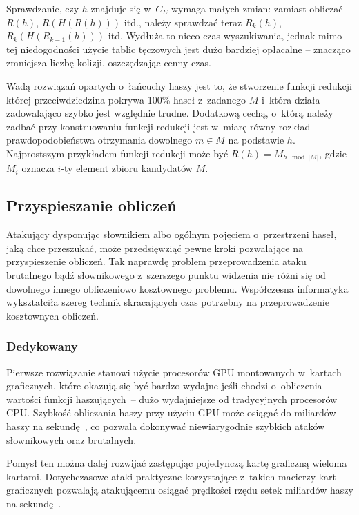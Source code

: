 Sprawdzanie, czy $h$ znajduje się w~$C_E$ wymaga małych zmian: zamiast obliczać
$R(h)$, $R(H(R(h)))$ itd., należy sprawdzać teraz $R_k(h)$, $R_k(H(R_{k-1}(h)))$
itd. Wydłuża to nieco czas wyszukiwania, jednak mimo tej niedogodności użycie
tablic tęczowych jest dużo bardziej opłacalne -- znacząco zmniejsza liczbę
kolizji, oszczędzając cenny czas.

Wadą rozwiązań opartych o~łańcuchy haszy jest to, że stworzenie funkcji
redukcji której przeciwdziedzina pokrywa 100\% haseł z~zadanego $M$ i~która
działa zadowalająco szybko jest względnie trudne. Dodatkową cechą, o~którą
należy zadbać przy konstruowaniu funkcji redukcji jest w~miarę równy rozkład
prawdopodobieństwa otrzymania dowolnego $m \in M$ na podstawie $h$.
Najprostszym przykładem funkcji redukcji może być $R(h) = M_{h \mod |M|}$,
gdzie $M_i$ oznacza $i$-ty element zbioru kandydatów $M$.



\subsection{Przyspieszanie obliczeń}
Atakujący dysponując słownikiem albo ogólnym pojęciem o~przestrzeni haseł, jaką
chce przeszukać, może przedsięwziąć pewne kroki pozwalające na przyspieszenie
obliczeń. Tak naprawdę problem przeprowadzenia ataku brutalnego bądź
słownikowego z~szerszego punktu widzenia nie różni się od dowolnego innego
obliczeniowo kosztownego problemu. Współczesna informatyka wykształciła szereg
technik skracających czas potrzebny na przeprowadzenie kosztownych obliczeń.



\subsubsection{Dedykowany }

Pierwsze rozwiązanie stanowi użycie procesorów GPU montowanych w~kartach
graficznych, które okazują się być bardzo wydajne jeśli chodzi o~obliczenia
wartości funkcji haszujących~-- dużo wydajniejsze od tradycyjnych procesorów
CPU. Szybkość obliczania haszy przy użyciu GPU może osiągać do miliardów
haszy na sekundę~\cite{gpu_cracking_benchmarks}, co pozwala dokonywać
niewiarygodnie szybkich ataków słownikowych oraz brutalnych.

Pomysł ten można dalej rozwijać zastępując pojedynczą kartę graficzną wieloma
kartami. Dotychczasowe ataki praktyczne korzystające z~takich macierzy kart
graficznych pozwalają atakującemu osiągać prędkości rzędu setek miliardów haszy
na sekundę~\cite{gpu_cracking_parallel}.



